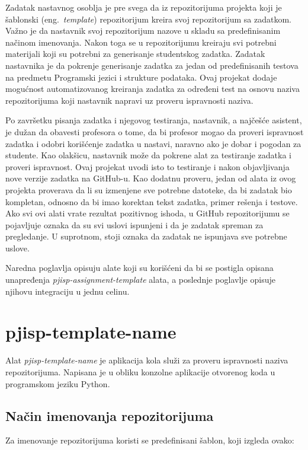 \documentclass[12pt]{report}
\begin{document}
Zadatak nastavnog osoblja je pre svega da iz repozitorijuma projekta koji je šablonski (eng.\ \textit{template}) repozitorijum kreira svoj repozitorijum sa zadatkom. Važno je da nastavnik svoj repozitorijum nazove u skladu sa predefinisanim načinom imenovanja. Nakon toga se u repozitorijumu kreiraju svi potrebni materijali koji su potrebni za generisanje studentskog zadatka. Zadatak nastavnika je da pokrenje generisanje zadatka za jedan od predefinisanih testova na predmetu Programski jezici i strukture podataka. Ovaj projekat dodaje mogućnost automatizovanog kreiranja zadatka za određeni test na osnovu naziva repozitorijuma koji nastavnik napravi uz proveru ispravnosti naziva.

Po završetku pisanja zadatka i njegovog testiranja, nastavnik, a najčešće asistent, je dužan da obavesti profesora o tome, da bi profesor mogao da proveri ispravnost zadatka i odobri korišćenje zadatka u nastavi, naravno ako je dobar i pogodan za studente. Kao olakšicu, nastavnik može da pokrene alat za testiranje zadatka i proveri ispravnost. Ovaj projekat uvodi isto to testiranje i nakon objavljivanja nove verzije zadatka na GitHub-u. Kao dodatnu proveru, jedan od alata iz ovog projekta proverava da li su izmenjene sve potrebne datoteke, da bi zadatak bio kompletan, odnosno da bi imao korektan tekst zadatka, primer rešenja i testove. Ako svi ovi alati vrate rezultat pozitivnog ishoda, u GitHub repozitorijumu se pojavljuje oznaka da su svi uslovi ispunjeni i da je zadatak spreman za pregledanje. U suprotnom, stoji oznaka da zadatak ne ispunjava sve potrebne uslove.

Naredna poglavlja opisuju alate koji su korišćeni da bi se postigla opisana unapređenja \textit{pjisp-assignment-template} alata, a poslednje poglavlje opisuje njihovu integraciju u jednu celinu.

\section{pjisp-template-name}
Alat \textit{pjisp-template-name} \cite{pjisp-template-name} je aplikacija kola služi za proveru ispravnosti naziva repozitorijuma. Napisana je u obliku konzolne aplikacije otvorenog koda u programskom jeziku Python.

\subsection{Način imenovanja repozitorijuma}
Za imenovanje repozitorijuma koristi se predefinisani šablon, koji izgleda ovako:
\end{document}

